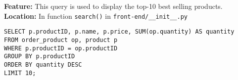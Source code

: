 \textbf{Feature:} This query is used to display the top-10 best selling products. \\
\textbf{Location:} In function \texttt{search()} in \texttt{front-end/\_\_init\_\_.py}

\begin{lstlisting}
SELECT p.productID, p.name, p.price, SUM(op.quantity) AS quantity
FROM order_product op, product p
WHERE p.productID = op.productID
GROUP BY p.productID
ORDER BY quantity DESC
LIMIT 10;
\end{lstlisting}